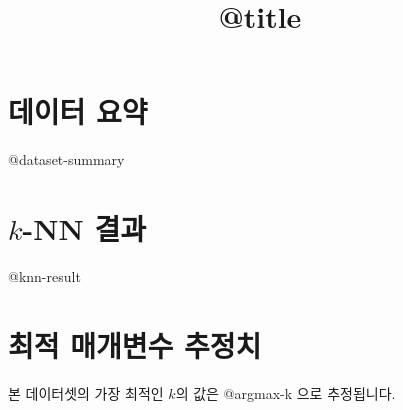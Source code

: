 \documentclass[a4paper]{article}
\title{@title}
\begin{document}
    \maketitle
    \section{데이터 요약}
    @dataset-summary

    \section{$k$-NN 결과}
    \begin{multicols}{3}
        \noindent
        @knn-result
    \end{multicols}
    \section{최적 매개변수 추정치}
    본 데이터셋의 가장 최적인 $k$의 값은 @argmax-k 으로 추정됩니다.
\end{document}
